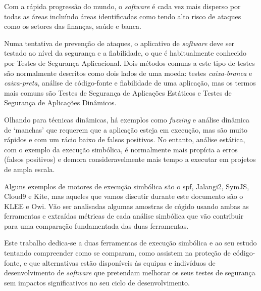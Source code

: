 
\makeatletter
\newcommand{\@keywords}{Execução Simbólica, Testes de Segurança Aplicacional, Análise Estática de Código, KLEE, Owi}
\makeatother

Com a rápida progressão do mundo, o \textit{software} é cada vez mais disperso por todas as áreas incluíndo áreas identificadas como tendo alto risco de ataques como os setores das finanças, saúde e banca.

Numa tentativa de prevenção de ataques, o aplicativo de \textit{software} deve ser testado ao nível da segurança e a fiabilidade, o que é habitualmente conhecido por Testes de Segurança Aplicacional. Dois métodos comuns a este tipo de testes são normalmente descritos como dois lados de uma moeda: testes \textit{caixa-branca} e \textit{caixa-preta}, análise de código-fonte e fiabilidade de uma aplicação, mas os termos mais comuns são Testes de Segurança de Aplicações Estáticos e Testes de Segurança de Aplicações Dinâmicos.

Olhando para técnicas dinâmicas, há exemplos como \textit{fuzzing} e análise dinâmica de `manchas' que requerem que a aplicação esteja em execução, mas são muito rápidos e com um rácio baixo de falsos positivos. No entanto, análise estática, com o exemplo da execução simbólica, é normalmente mais propícia a erros (falsos positivos) e demora consideravelmente mais tempo a executar em projetos de ampla escala.

Alguns exemplos de motores de execução simbólica são o \acrlong{spf}, Jalangi2, SymJS, Cloud9 e Kite, mas aqueles que vamos discutir durante este documento são o KLEE e Owi. Vão ser analisadas algumas amostras de cógido usando ambas as ferramentas e extraídas métricas de cada análise simbólica que vão contribuir para uma comparação fundamentada das duas ferramentas.

Este trabalho dedica-se a duas ferramentas de execução simbólica e ao seu estudo tentando compreender como se comparam, como assistem na proteção de código-fonte, e que alternativas estão disponíveis às equipas e indivíduos de desenvolvimento de \textit{software} que pretendam melhorar os seus testes de segurança sem impactos significativos no seu ciclo de desenvolvimento.

